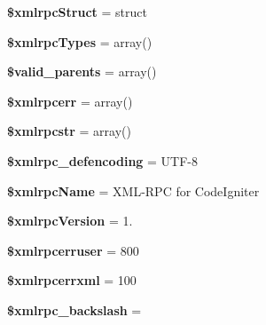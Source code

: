 \begin{DoxyCompactItemize}
{\bfseries \$xmlrpc\+Struct} = \textquotesingle{}struct\textquotesingle{}
\item 
\mbox{\label{class_c_i___xmlrpc_a041bc2f12b13331e6a88d083af4a5e3d}} 
{\bfseries \$xmlrpc\+Types} = array()
\item 
\mbox{\label{class_c_i___xmlrpc_ab22cdea6d089453d9c386cbb4ef5749c}} 
{\bfseries \$valid\+\_\+parents} = array()
\item 
\mbox{\label{class_c_i___xmlrpc_ae77aa85389c86cf77c3e1cc3ec80e774}} 
{\bfseries \$xmlrpcerr} = array()
\item 
\mbox{\label{class_c_i___xmlrpc_abb67c2e43cb575caccd2a36d8793568c}} 
{\bfseries \$xmlrpcstr} = array()
\item 
\mbox{\label{class_c_i___xmlrpc_ae0b16f71fbf05a11954aac6e416d6813}} 
{\bfseries \$xmlrpc\+\_\+defencoding} = \textquotesingle{}U\+TF-\/8\textquotesingle{}
\item 
\mbox{\label{class_c_i___xmlrpc_ac62e2e9a08e9560da9f56b52d9698cba}} 
{\bfseries \$xmlrpc\+Name} = \textquotesingle{}X\+ML-\/R\+PC for Code\+Igniter\textquotesingle{}
\item 
\mbox{\label{class_c_i___xmlrpc_ae31b8b93bfb90b6d826cf4c73ecec5c9}} 
{\bfseries \$xmlrpc\+Version} = \textquotesingle{}1.\textquotesingle{}
\item 
\mbox{\label{class_c_i___xmlrpc_a57cef14d94c1718bb52f36b9bacc0e95}} 
{\bfseries \$xmlrpcerruser} = 800
\item 
\mbox{\label{class_c_i___xmlrpc_a66ba85bb4a88675acab1a6657f7d0248}} 
{\bfseries \$xmlrpcerrxml} = 100
\item 
\mbox{\label{class_c_i___xmlrpc_a6f45c5f8f9f2467649174ee54edc116f}} 
{\bfseries \$xmlrpc\+\_\+backslash} = \textquotesingle{}\textquotesingle{}
\item 
\mbox{\label{class_c_i___xmlrpc_afafd1a987f6d159d22b659d6dc4e6870}} 

\end{DoxyCompactItemize}
